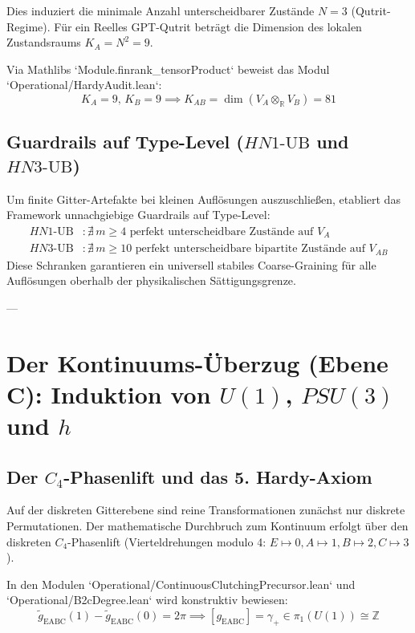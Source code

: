 \documentclass[11pt,a4paper]{article}
\begin{document}
Dies induziert die minimale Anzahl unterscheidbarer Zustände $N=3$ (Qutrit-Regime). Für ein Reelles GPT-Qutrit beträgt die Dimension des lokalen Zustandsraums $K_A = N^2 = 9$. 

Via Mathlibs `Module.finrank_tensorProduct` beweist das Modul `Operational/HardyAudit.lean`:
\begin{equation}
K_A = 9, \, K_B = 9 \implies K_{AB} = \dim(V_A \otimes_{\mathbb{R}} V_B) = 81
\end{equation}

\subsection{Guardrails auf Type-Level ($HN1\text{-}\text{UB}$ und $HN3\text{-}\text{UB}$)}

Um finite Gitter-Artefakte bei kleinen Auflösungen auszuschließen, etabliert das Framework unnachgiebige Guardrails auf Type-Level:
\begin{align}
HN1\text{-}\text{UB} &: \nexists\, m \ge 4 \text{ perfekt unterscheidbare Zustände auf } V_A \\
HN3\text{-}\text{UB} &: \nexists\, m \ge 10 \text{ perfekt unterscheidbare bipartite Zustände auf } V_{AB}
\end{align}
Diese Schranken garantieren ein universell stabiles Coarse-Graining für alle Auflösungen oberhalb der physikalischen Sättigungsgrenze.

---

\section{Der Kontinuums-Überzug (Ebene C): Induktion von $U(1)$, $PSU(3)$ und $h$}

\subsection{Der $C_4$-Phasenlift und das 5. Hardy-Axiom}

Auf der diskreten Gitterebene sind reine Transformationen zunächst nur diskrete Permutationen. Der mathematische Durchbruch zum Kontinuum erfolgt über den diskreten $C_4$-Phasenlift (Vierteldrehungen modulo 4: $E \mapsto 0, A \mapsto 1, B \mapsto 2, C \mapsto 3$).

In den Modulen `Operational/ContinuousClutchingPrecursor.lean` und `Operational/B2cDegree.lean` wird konstruktiv bewiesen:
\begin{equation}
\tilde{g}_{\text{EABC}}(1) - \tilde{g}_{\text{EABC}}(0) = 2\pi \implies [g_{\text{EABC}}] = \gamma_+ \in \pi_1(U(1)) \cong \mathbb{Z}
\end{equation}
\end{document}
